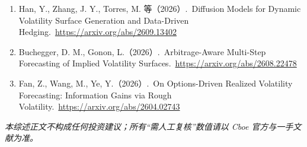 \documentclass[11pt,a4paper]{article}
\begin{document}
\begin{enumerate}[leftmargin=2.2em]
  \item Han, Y., Zhang, J. Y., Torres, M. 等（2026）.\ Diffusion Models for Dynamic Volatility Surface Generation and Data-Driven Hedging.\ \url{https://arxiv.org/abs/2609.13402}
  \item Buchegger, D. M., Gonon, L.（2026）.\ Arbitrage-Aware Multi-Step Forecasting of Implied Volatility Surfaces.\ \url{https://arxiv.org/abs/2608.22478}
  \item Fan, Z., Wang, M., Ye, Y.（2026）.\ On Options-Driven Realized Volatility Forecasting: Information Gains via Rough Volatility.\ \url{https://arxiv.org/abs/2604.02743}
\end{enumerate}

\vspace{1.5em}
\begin{center}
\small\itshape 本综述正文不构成任何投资建议；所有“需人工复核”数值请以 Cboe 官方与一手文献为准。\par
\end{center}
\end{document}
